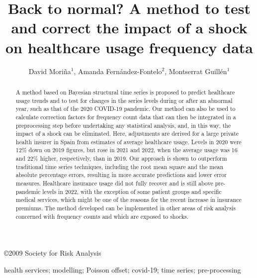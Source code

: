 \documentclass[]{risa}
\begin{document}
\jvol{}
\jnum{}
\pubyear{}

\doi{}
\copyright{2009 Society for Risk Analysis}
\issnyear{}

\title[Back to normal?]{Back to normal? A method to test and correct the impact of a shock on healthcare usage frequency data}

\author[David Mori\~na et al.]{David Mori\~na$^{1}$,
Amanda Fern\'andez-Fontelo$^{2}$,
Montserrat Guill\'en$^{1}$
} 

\begin{abstract}
A method based on Bayesian structural time series is proposed to predict healthcare usage trends and to test for changes in the series levels during or after an abnormal year, such as that of the 2020 COVID-19 pandemic. Our method can also be used to calculate correction factors for frequency count data that can then be integrated in a preprocessing step before undertaking any statistical analysis, and, in this way, the impact of a shock can be eliminated. Here, adjustments are derived for a large private health insurer in Spain from estimates of average healthcare usage. Levels in 2020 were 12\% down on 2019 figures, but rose in 2021 and 2022, when the average usage was 16 and 22\% higher, respectively, than in 2019. Our approach is shown to outperform traditional time series techniques, including the root mean square and the mean absolute percentage errors, resulting in more accurate predictions and lower error measures. Healthcare insurance usage did not fully recover and is still above pre-pandemic levels in 2022, with the exception of some patient groups and specific medical services, which might be one of the reasons for the recent increase in insurance premiums. The method developed can be implemented in other areas of risk analysis concerned with frequency counts and which are exposed to shocks.
\end{abstract}

\begin{keywords}
health services; modelling; Poisson offset; covid-19; time series; pre-processing
\end{keywords}

\maketitle
\end{document}
